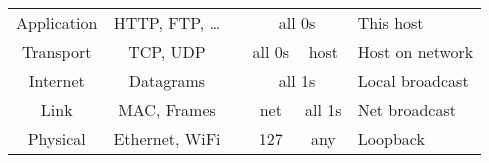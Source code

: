 \documentclass[10pt]{extarticle}
\begin{document}
\begin{multicols}{2}
  \hspace{0.5em}
  \small
  \begin{tabular}{|c|c|p{0em}|c|c|c|c|l|}
    \cline{0-1}
    \cline{4-8}
    Application                & HTTP, FTP, \dots             &     & \multicolumn{4}{|c|}{all 0s}
                               & This host                                                                                                \\
    \cline{0-1}
    \cline{4-8}
    Transport                  & TCP, UDP                     &     & \multicolumn{2}{|c|}{all 0s} &
    \multicolumn{2}{|c|}{host} & Host on network                                                                                          \\
    \cline{0-1}
    \cline{4-8}
    Internet                   & Datagrams                    &     & \multicolumn{4}{|c|}{all 1s}
                               & Local broadcast                                                                                          \\
    \cline{0-1}
    \cline{4-8}Link            & MAC, Frames                  &     &
    \multicolumn{2}{|c|}{net}  & \multicolumn{2}{|c|}{all 1s} & Net
    broadcast                                                                                                                             \\
    \cline{0-1}
    \cline{4-8}Physical        & Ethernet, WiFi               &     & 127                          & \multicolumn{3}{|c|}{any} & Loopback \\
    \cline{0-1}
    \cline{4-8}
  \end{tabular}
  \normalsize

\end{multicols}
\end{document}
